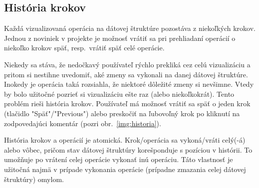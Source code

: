 \subsection{História krokov}
Každá vizualizovaná operácia na dátovej štruktúre pozostáva
z niekoľkých krokov. Jednou z noviniek v projekte je možnosť vrátiť sa pri
prehliadaní operácií o niekoľko krokov späť, resp.\ vrátiť späť
celé operácie.

Niekedy sa stáva, že nedočkavý používateľ rýchlo prekliká cez celú vizualizáciu
a pritom si nestihne uvedomiť, aké zmeny sa vykonali na danej dátovej
štruktúre. Inokedy je operácia taká rozsiahla, že niektoré dôležité zmeny si
nevšimne. Vtedy by bolo užitočné pozrieť si vizualizáciu ešte raz (alebo
niekoľkokrát). Tento problém rieši história krokov. Používateľ má možnosť vrátiť
sa späť o jeden krok (tlačidlo "Späť"/"Previous") alebo preskočiť na ľubovoľný
krok po kliknutí na zodpovedajúci komentár (pozri obr.~\ref{img:historia}).

História krokov a operácií je atomická. Krok/operácia sa vykoná/vráti celý(-á)
alebo vôbec, pričom stav dátovej štruktúry korešponduje s pozíciou v histórii.
To umožňuje po vrátení celej operácie vykonať inú operáciu. Táto vlastnosť je
užitočná najmä v prípade vykonania operácie (prípadne zmazania celej dátovej
štruktúry) omylom.

